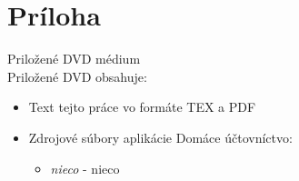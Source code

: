 \documentclass[12pt,oneside]{book}
\begin{document}
\newcommand{\dbappendix}[1]{\chapter{#1}}
\appendix
\dbappendix{Príloha}\label{appA}
{\large Priložené DVD médium}\\

Priložené DVD obsahuje:\\
\begin{itemize}
\item Text tejto práce vo formáte TEX a PDF
\item Zdrojové súbory aplikácie Domáce účtovníctvo:
	\begin{itemize}
		\item {\em nieco} - nieco
	\end{itemize}
\end{itemize}
\end{document}
